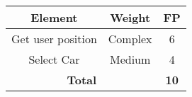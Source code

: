 \begin{center}
\begin{tabular}{|c|c|c|}
\hline
\multicolumn{1}{|c|}{\textbf{Element}} & \multicolumn{1}{c|}{\textbf{Weight}} & \multicolumn{1}{c|}{\textbf{FP}}\\
\hline
Get user position	&Complex	&6\\
Select Car			&Medium		&4\\
\hline
\multicolumn{2}{|c|}{\textbf{Total}} & \multicolumn{1}{c|}{\textbf{10}}\\
\hline
\end{tabular}
\end{center}
